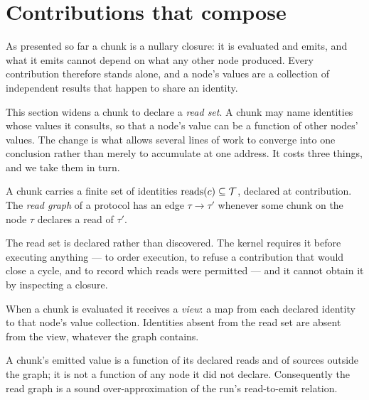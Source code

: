 
\section{Contributions that compose}
\label{sec:composition}

As presented so far a chunk is a nullary closure: it is evaluated and emits,
and what it emits cannot depend on what any other node produced. Every
contribution therefore stands alone, and a node's values are a collection of
independent results that happen to share an identity.

This section widens a chunk to declare a \emph{read set}. A chunk may name
identities whose values it consults, so that a node's value can be a function
of other nodes' values. The change is what allows several lines of work to
converge into one conclusion rather than merely to accumulate at one address.
It costs three things, and we take them in turn.

\begin{definition}
\label{def:reads}
A chunk carries a finite set of identities $\mathrm{reads}(c)\subseteq\mathcal{T}$,
declared at contribution. The \emph{read graph} of a protocol has an edge
$\tau\to\tau'$ whenever some chunk on the node $\tau$ declares a read of
$\tau'$.
\end{definition}

The read set is declared rather than discovered. The kernel requires it before
executing anything --- to order execution, to refuse a contribution that would
close a cycle, and to record which reads were permitted --- and it cannot
obtain it by inspecting a closure.

\begin{definition}
\label{def:view}
When a chunk is evaluated it receives a \emph{view}: a map from each declared
identity to that node's value collection. Identities absent from the read set
are absent from the view, whatever the graph contains.
\end{definition}

\begin{proposition}
\label{prop:read-bound}
A chunk's emitted value is a function of its declared reads and of sources
outside the graph; it is not a function of any node it did not declare.
Consequently the read graph is a sound over-approximation of the run's
read-to-emit relation.
\end{proposition}

